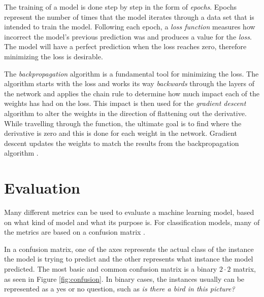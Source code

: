 \documentclass[nofilelist]{cslthse-msc}
\begin{document}
The training of a model is done step by step in the form of \textit{epochs}. Epochs represent the number of times that the model iterates through a data set that is intended to train the model. Following each epoch, a \textit{loss function} measures how incorrect the model's previous prediction was and produces a value for the \textit{loss}. The model will have a perfect prediction when the loss reaches zero, therefore minimizing the loss is desirable. 

The \textit{backpropagation} algorithm is a fundamental tool for minimizing the loss. The algorithm starts with the loss and works its way \textit{backwards} through the layers of the network and applies the chain rule to determine how much impact each of the weights has had on the loss. This impact is then used for the \textit{gradient descent} algorithm to alter the weights in the direction of flattening out the derivative. While travelling through the function, the ultimate goal is to find where the derivative is zero and this is done for each weight in the network. Gradient descent updates the weights to match the results from the backpropagation algorithm \citep{franoischollet2017learning}. 










\section{Evaluation}
Many different metrics can be used to evaluate a machine learning model, based on what kind of model and what its purpose is. For classification models, many of the metrics are based on a confusion matrix \citep{FAWCETT2006861}. 

In a confusion matrix, one of the axes represents the actual class of the instance the model is trying to predict and the other represents what instance the model predicted. The most basic and common confusion matrix is a binary $2 \cdot 2$ matrix, as seen in Figure \ref{fig:confusion}. In binary cases, the instances usually can be represented as a yes or no question, such as \textit{is there a bird in this picture?}
\end{document}
